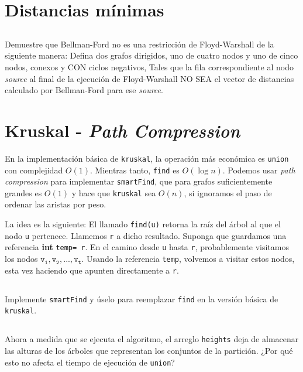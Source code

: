 %

\section{Distancias mínimas}
\subsection{} Demuestre que Bellman-Ford no es una restricción de Floyd-Warshall de la siguiente manera: Defina dos grafos dirigidos, uno de cuatro nodos y uno de cinco nodos, conexos y CON ciclos negativos, Tales que la fila correspondiente al nodo \emph{source} al final de la ejecución de Floyd-Warshall NO SEA el vector de distancias calculado por Bellman-Ford para ese \emph{source}.

%

\section{Kruskal - \emph{Path Compression}}
En la implementación básica de \texttt{kruskal}, la operación más económica es \texttt{union} con complejidad $O(1)$. Mientras tanto, \texttt{find} es $O(\log n)$. Podemos usar \emph{path compression} para implementar \texttt{smartFind}, que para grafos suficientemente grandes es $O(1)$ y hace que \texttt{kruskal} sea $O(n)$, si ignoramos el paso de ordenar las aristas por peso.

La idea es la siguiente: El llamado \texttt{find(u)} retorna la raíz del árbol al que el nodo \texttt{u} pertenece. Llamemos \texttt{r} a dicho resultado. Suponga que guardamos una referencia \textbf{int} \texttt{temp= r}. En el camino desde \texttt{u} hasta \texttt{r}, probablemente visitamos los nodos $\mathtt{v_1, v_2,..., v_t}$. Usando la referencia \texttt{temp}, volvemos a visitar estos nodos, esta vez haciendo que apunten directamente a \texttt{r}.

\subsection{} Implemente \texttt{smartFind} y úselo para reemplazar \texttt{find} en la versión básica de \texttt{kruskal}.

\subsection{} Ahora a medida que se ejecuta el algoritmo, el arreglo \texttt{heights} deja de almacenar las alturas de los árboles que representan los conjuntos de la partición. ¿Por qué esto no afecta el tiempo de ejecución de \texttt{union}?

